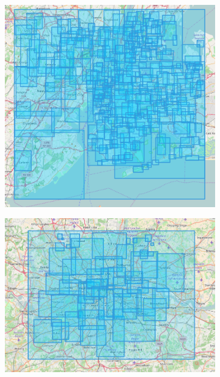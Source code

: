 \begin{figure}[htbp]
	\centering
	\begin{subfigure}[htbp]{0.3\textwidth}
		\centering
		\includegraphics[width=1\linewidth]{figures/nyc_bbs.png}
		\caption{}
		\label{subfig:nyc_bounding_boxes}
	\end{subfigure}
	\quad
	\begin{subfigure}[htbp]{0.3\textwidth}
		\centering
		\includegraphics[width=1\linewidth]{figures/london_bbs.png}
		\caption{}
		\label{subfig:london_bounding_boxes}

\end{subfigure}
\end{figure}

